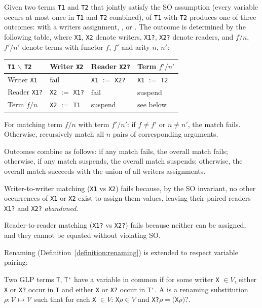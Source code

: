\begin{definition}\label{definition:term-matching}
Given two terms \verb|T1| and \verb|T2| that jointly satisfy the SO assumption (every variable occurs at most once in \verb|T1| and \verb|T2| combined),  of \verb|T1| with \verb|T2| produces one of three outcomes:  with a writers assignment, , or . The outcome is determined by the following table, where \verb|X1|, \verb|X2| denote writers, \verb|X1?|, \verb|X2?| denote readers, and $f/n$, $f'/n'$ denote terms with functor $f$, $f'$ and arity $n$, $n'$:

\begin{center}
\begin{tabular}{l|lll}
\verb|T1| $\backslash$ \verb|T2| & Writer \verb|X2| & Reader \verb|X2?| & Term $f'/n'$ \\
\hline
Writer \verb|X1| & fail & \verb|X1| $:=$ \verb|X2?| & \verb|X1| $:=$ \verb|T2| \\
Reader \verb|X1?| & \verb|X2| $:=$ \verb|X1?| & fail & suspend \\
Term $f/n$ & \verb|X2| $:=$ \verb|T1| & suspend & see below \\
\end{tabular}
\end{center}

For matching term $f/n$ with term $f'/n'$: if $f \ne f'$ or $n \ne n'$, the match fails. Otherwise, recursively match all $n$ pairs of corresponding arguments.

Outcomes combine as follows: if any match fails, the overall match fails; otherwise, if any match suspends, the overall match suspends; otherwise, the overall match succeeds with the union of all writers assignments.
\end{definition}

\begin{remark}
Writer-to-writer matching (\verb|X1| vs \verb|X2|) fails because, by the SO invariant, no other occurrences of \verb|X1| or \verb|X2| exist to assign them values, leaving their paired readers \verb|X1?| and \verb|X2?| \emph{abandoned}.

Reader-to-reader matching (\verb|X1?| vs \verb|X2?|) fails because neither can be assigned, and they cannot be equated without violating SO.
\end{remark}

Renaming (Definition~\ref{definition:renaming}) is extended to respect variable pairing:
\begin{definition}\label{definition:GLP-renaming}
Two GLP terms \verb|T|, \verb|T'| have a variable in common if for some writer \verb|X| $\in V$, either \verb|X| or \verb|X?| occur in \verb|T| and either \verb|X| or \verb|X?| occur in \verb|T'|. A  is a renaming substitution $\rho: \mathcal{V} \mapsto \mathcal{V}$ such that for each \verb|X| $\in V$: \verb|X|$\rho \in V$ and \verb|X?|$\rho = ($\verb|X|$\rho)?$.
\end{definition}

